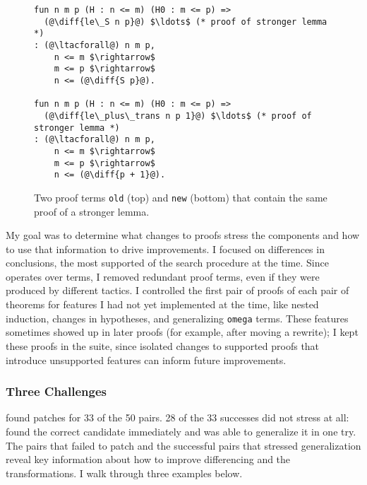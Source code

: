 \begin{figure*}
\begin{lstlisting}[language=coq]
fun n m p (H : n <= m) (H0 : m <= p) =>
  (@\diff{le\_S n p}@) $\ldots$ (* proof of stronger lemma *)
: (@\ltacforall@) n m p,
    n <= m $\rightarrow$
    m <= p $\rightarrow$
    n <= (@\diff{S p}@).

fun n m p (H : n <= m) (H0 : m <= p) =>
  (@\diff{le\_plus\_trans n p 1}@) $\ldots$ (* proof of stronger lemma *)
: (@\ltacforall@) n m p,
    n <= m $\rightarrow$
    m <= p $\rightarrow$
    n <= (@\diff{p + 1}@).
\end{lstlisting}
\caption{Two proof terms \lstinline{old} (top) and \lstinline{new} (bottom) that contain the same proof of a stronger lemma.}
\label{fig:stronger}
\end{figure*}

My goal was to determine what changes to proofs stress the components
and how to use that information to drive improvements.
I focused on differences in conclusions, the most supported  of the search procedure at the time.
Since \sysname operates over terms,
I removed redundant proof terms, even if they were produced by different tactics.
I controlled the first pair of proofs of each pair of theorems for features I had not yet implemented at the time,
like nested induction, changes in hypotheses, and generalizing \lstinline{omega} terms.
These features sometimes showed up in later proofs (for example, after moving a rewrite);
I kept these proofs in the suite, since isolated changes to supported proofs that
introduce unsupported features can inform future improvements.	

\subsubsection{Three Challenges}
\label{sec:fail}

\sysname found patches for 33 of the 50 pairs. 28 of the 33 successes
did not stress \sysname at all: \sysname found the correct candidate immediately and was able to generalize it
in one try.
The pairs that \sysname failed to patch and the successful pairs that stressed generalization
reveal key information about how to improve differencing and the transformations.
I walk through three examples below.

